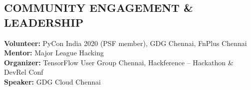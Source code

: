 \documentclass[margin,line]{resume}
\begin{document}
\begin{resume}
\section{\mysidestyle \textbf{\large{C}\small{OMMUNITY} \large{E}\small{NGAGEMENT \&} \large{L}\small{EADERSHIP}}}

\textbf{Volunteer:} PyCon India 2020 (PSF member), GDG Chennai, FnPlus Chennai\\
\textbf{Mentor:} Major League Hacking\\
\textbf{Organizer:} TensorFlow User Group Chennai, Hackference -- Hackathon \& DevRel Conf\\
\textbf{Speaker:} GDG Cloud Chennai

\end{resume}
\end{document}
